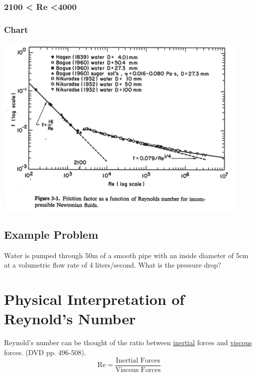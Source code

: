 \documentclass[paper=a4, fontsize=12pt]{scrartcl} %
\numberwithin{equation}{section} %
\numberwithin{figure}{section} %
\numberwithin{table}{section} %
\begin{document}
\vspace{1.5cm}  \subsubsection*{2100 < Re <4000}




\newpage 

\subsubsection*{Chart}

\includegraphics[scale=0.9]{Figure3-1.png}

\vspace{-1cm}  \subsection*{Example Problem}

Water is pumped through 50m of a smooth pipe with an inside diameter of 5cm at a volumetric flow rate of 4 liters/second. What is the pressure drop? 



\newpage

\section*{Physical Interpretation of Reynold's Number}

Reynold's number can be thought of the ratio between \underline{inertial} forces and \underline{viscous} forces. (DVD pp. 496-508).
\begin{equation*}
\text{Re}=\frac{\text{Inertial Forces}}{\text{Viscous Forces}}
\end{equation*}
\end{document}
